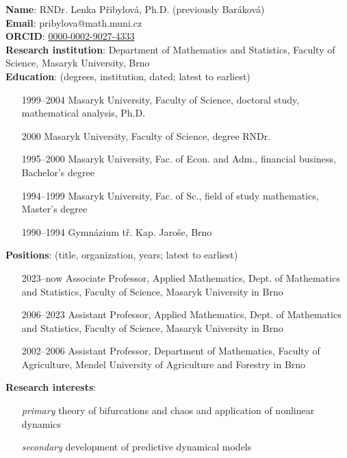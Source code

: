 \documentclass[a4paper,11pt]{scrartcl}
\begin{document}
\textbf{Name}: RNDr. Lenka Přibylová, Ph.D. (previously Baráková) \\
\textbf{Email}: pribylova@math.muni.cz \\
\textbf{ORCID}: \href{https://orcid.org/0000-0002-9027-4333}{0000-0002-9027-4333}\\
\textbf{Research institution}: Department of Mathematics and Statistics, Faculty of Science, Masaryk University, Brno \\
\textbf{Education}: (degrees, institution, dated; latest to earliest)
\begin{enumerate}[leftmargin=2.5cm]
    \item[1999–2004] Masaryk University, Faculty of Science, doctoral study, mathematical analysis, Ph.D.
    \item[2000] Masaryk University, Faculty of Science, degree RNDr.
    \item[1995–2000] Masaryk University, Fac. of Econ. and Adm., financial business, Bachelor's degree
    \item[1994–1999] Masaryk University, Fac. of Sc., field of study mathematics, Master's degree
    \item[1990–1994] Gymnázium tř. Kap. Jaroše, Brno
\end{enumerate}
\textbf{Positions}: (title, organization, years; latest to earliest)
\begin{enumerate}[leftmargin=2.5cm]
    \item[2023–now] Associate Professor, Applied Mathematics, Dept. of Mathematics and Statistics, Faculty of Science, Masaryk University in Brno
    \item[2006–2023] Assistant Professor, Applied Mathematics, Dept. of Mathematics and Statistics, Faculty of Science, Masaryk University in Brno
    \item[2002–2006] Assistant Professor, Department of Mathematics, Faculty of Agriculture, Mendel University of Agriculture and Forestry in Brno
\end{enumerate}
\textbf{Research interests}: 
\begin{enumerate}[leftmargin=2.5cm]
    \item[\textit{primary}] theory of bifurcations and chaos and application of nonlinear dynamics 
    \item[\textit{secondary}] development of predictive dynamical models
\end{enumerate}
\end{document}
